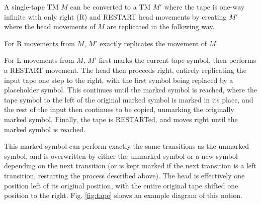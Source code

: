 \documentclass{article}
\begin{document}
A single-tape TM $M$ can be converted to a TM $M'$ where the tape is one-way
infinite with only right (R) and RESTART head movements by creating $M'$ where
the head movements of $M$ are replicated in the following way.

For R movements from $M$, $M'$ exactly replicates the movement of $M$.

For L movements from $M$, $M'$ first marks the current tape symbol, then
performs a RESTART movement. The head then proceeds right, entirely replicating
the input tape one step to the right, with the first symbol being replaced
by a placeholder symbol. This continues until the marked symbol is reached,
where the tape symbol to the left of the original marked symbol is marked in its
place, and the rest of the input then continues to be copied, unmarking the
originally marked symbol. Finally, the tape is RESTARTed, and moves right until
the marked symbol is reached.

This marked symbol can perform exactly the same transitions as the unmarked
symbol, and is overwritten by either the unmarked symbol or a new symbol
depending on the next transition (or is kept marked if the next transition is a
left transition, restarting the process described above). The head is
effectively  one position left of its original position, with the entire
original tape shifted one position to the right. Fig. \ref{fig:tape} shows an
example diagram of this notion.
\end{document}
